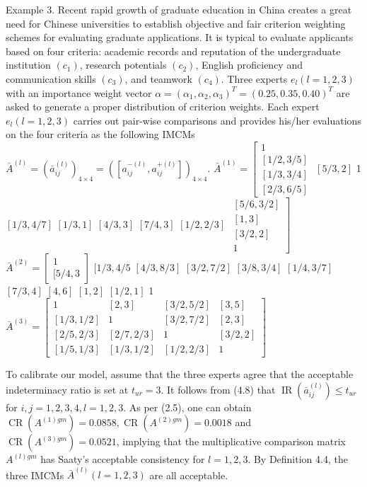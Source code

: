 \documentclass[10pt]{article}
\begin{document}
Example 3. Recent rapid growth of graduate education in China creates a great need for Chinese universities to establish objective and fair criterion weighting schemes for evaluating graduate applications. It is typical to evaluate applicants based on four criteria: academic records and reputation of the undergraduate institution $\left(c_{1}\right)$, research potentials $\left(c_{2}\right)$, English proficiency and communication skills $\left(c_{3}\right)$, and teamwork $\left(c_{4}\right)$. Three experts $e_{l}(l=1,2,3)$ with an importance weight vector $\alpha=\left(\alpha_{1}, \alpha_{2}, \alpha_{3}\right)^{T}=(0.25,0.35,0.40)^{T}$ are asked to generate a proper distribution of criterion weights. Each expert $e_{l}(l=1,2,3)$ carries out pair-wise comparisons and provides his/her evaluations on the four criteria as the following IMCMs $\bar{A}^{(l)}=\left(\bar{a}_{i j}^{(l)}\right)_{4 \times 4}=\left(\left[a_{i j}^{-(l)}, a_{i j}^{+(l)}\right]\right)_{4 \times 4}$.
$\bar{A}^{(1)}=\left[\begin{array}{c}1 \\ {[1 / 2,3 / 5]} \\ {[1 / 3,3 / 4]} \\ {[2 / 3,6 / 5]}\end{array}\right.$
$[5 / 3,2]$
1
$[1 / 3,4 / 7]$
$[1 / 3,1]$
$[4 / 3,3]$
$[7 / 4,3]$
$[1 / 2,2 / 3]$
$\left.\begin{array}{c}{[5 / 6,3 / 2]} \\ {[1,3]} \\ {[3 / 2,2]} \\ 1\end{array}\right]$
$\bar{A}^{(2)}=\left[\begin{array}{c}1 \\ {[5 / 4,3}\end{array}\right]$
$[1 / 3,4 / 5$
$[4 / 3,8 / 3]$
$[3 / 2,7 / 2]$
$[3 / 8,3 / 4]$
$[1 / 4,3 / 7]$
$[7 / 3,4]$
$[4,6]$
$[1,2]$
$[1 / 2,1]$
1
$\bar{A}^{(3)}=\left[\begin{array}{cccc}1 & {[2,3]} & {[3 / 2,5 / 2]} & {[3,5]} \\ {[1 / 3,1 / 2]} & 1 & {[3 / 2,7 / 2]} & {[2,3]} \\ {[2 / 5,2 / 3]} & {[2 / 7,2 / 3]} & 1 & {[3 / 2,2]} \\ {[1 / 5,1 / 3]} & {[1 / 3,1 / 2]} & {[1 / 2,2 / 3]} & 1\end{array}\right]$

To calibrate our model, assume that the three experts agree that the acceptable indeterminacy ratio is set at $t_{u r}=3$. It follows from (4.8) that $\operatorname{IR}\left(\bar{a}_{i j}^{(l)}\right) \leq t_{u r}$ for $i, j=1,2,3,4, l=1,2,3$. As per (2.5), one can obtain $\operatorname{CR}\left(A^{(1) g m}\right)=0.0858, \operatorname{CR}\left(A^{(2) g m}\right)=0.0018$ and $\operatorname{CR}\left(A^{(3) g m}\right)=0.0521$, implying that the multiplicative comparison matrix $A^{(l) g m}$ has Saaty's acceptable consistency for $l=1,2,3$. By Definition 4.4, the three IMCMs $\bar{A}^{(l)}(l=1,2,3)$ are all acceptable.
\end{document}
